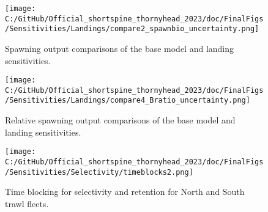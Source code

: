 \documentclass[11pt,
  english,
  letterpaper,
]{article}
\begin{document}
\begin{figure}
\centering
\texttt{[image: C:/GitHub/Official\_shortspine\_thornyhead\_2023/doc/FinalFigs/Sensitivities/Landings/compare2\_spawnbio\_uncertainty.png]}
\caption{Spawning output comparisons of the base model and landing sensitivities.\label{fig:land_sensitiv_spawning}}
\end{figure}

\begin{figure}
\centering
\texttt{[image: C:/GitHub/Official\_shortspine\_thornyhead\_2023/doc/FinalFigs/Sensitivities/Landings/compare4\_Bratio\_uncertainty.png]}
\caption{Relative spawning output comparisons of the base model and landing sensitivities.\label{fig:land_sensitiv_mngmt}}
\end{figure}

\clearpage

\begin{figure}
\centering
\texttt{[image: C:/GitHub/Official\_shortspine\_thornyhead\_2023/doc/FinalFigs/Sensitivities/Selectivity/timeblocks2.png]}
\caption{Time blocking for selectivity and retention for North and South trawl fleets.\label{fig:timeblocks}}
\end{figure}
\end{document}
